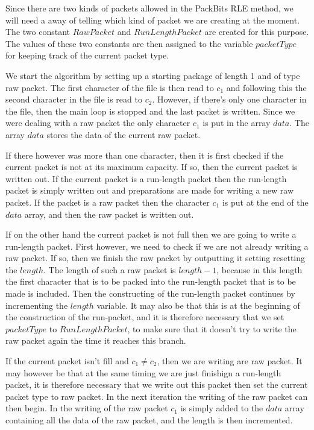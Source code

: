 Since there are two kinds of packets allowed in the PackBits RLE
method, we will need a away of telling which kind of packet we are
creating at the moment. The two constant $RawPacket$ and
$RunLengthPacket$ are created for this purpose. The values of these
two constants are then assigned to the variable $packetType$ for
keeping track of the current packet type.

We start the algorithm by setting up a starting package of length 1
and of type raw packet. The first character of the file is then read
to $c_1$ and following this the second character in the file is read
to $c_2$. However, if there's only one character in the file, then the
main loop is stopped and the last packet is written. Since we were
dealing with a raw packet the only character $c_1$ is put in the array
$data$. The array $data$ stores the data of the current raw packet.

If there however was more than one character, then it is first checked
if the current packet is not at its maximum capacity. If so, then the
current packet is written out. If the current packet is a run-length
packet then the run-length packet is simply written out and
preparations are made for writing a new raw packet. If the packet is a
raw packet then the character $c_1$ is put at the end of the $data$
array, and then the raw packet is written out.

If on the other hand the current packet is not full then we are going
to write a run-length packet. First however, we need to check if we
are not already writing a raw packet. If so, then we finish the raw
packet by outputting it setting resetting the $length$. The length of
such a raw packet is $length - 1$, because in this length the
first character that is to be packed into the run-length packet that is to
be made is included.  Then the constructing of the run-length packet
continues by incrementing the $length$ variable. It may also be that
this is at the beginning of the construction of the run-packet, and it
is therefore necessary that we set  $packetType$ to $RunLengthPacket$,
to make sure that it doesn't try to write the raw packet again the
time it reaches this branch.

If the current packet isn't fill and $c_1 \neq c_2$,  then we are
writing are raw packet. It may however be that at the same timing we
are just finishign a run-length packet, it is therefore necessary that
we write out this packet then set the current packet type to raw
packet. In the next iteration the writing of the raw packet can then
begin. In the writing of the raw packet $c_1$ is simply added to the
$data$ array containing all the data of the raw packet, and the length
is then incremented.

